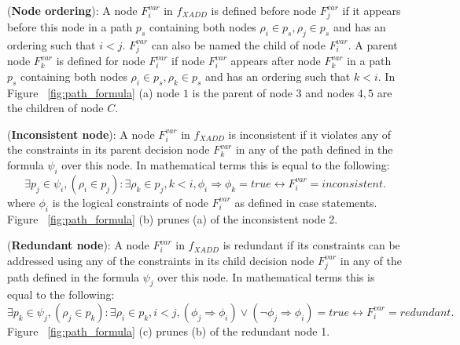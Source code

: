 \documentclass[twoside,11pt]{article}
\newenvironment{mydef}[1][Definition]{\begin{trivlist}
\item[\hskip \labelsep {\bfseries #1}]}{\end{trivlist}}
\begin{document}
\begin{mydef}(\textbf{Node ordering}):
A node $F_i^{var}$ in $f_{XADD}$ is defined before node $F_j^{var}$ if it appears before this node in a path $p_s$ containing both nodes $\rho_i \in p_s, \rho_j \in p_s$ and has an ordering such that $i<j$. $F_j^{var}$ can also be named the child of node $F_i^{var}$. A parent node $F_k^{var}$ is defined for node  $F_i^{var}$ if node  $F_i^{var}$ appears after node $F_k^{var}$ in a path $p_s$ containing both nodes $\rho_i \in p_s, \rho_k \in p_s$ and has an ordering such that $k<i$. In Figure ~\ref{fig:path_formula} (a) node $1$ is the parent of node $3$ and nodes $4,5$ are the children of node $C$.
\end{mydef}

\begin{mydef}(\textbf{Inconsistent node}):
A node $F_i^{var}$ in $f_{XADD}$ is inconsistent if it violates any of the constraints in its parent decision node $F_k^{var}$ in any of the path defined in the formula $\psi_{i}$ over this node. In mathematical terms this is equal to the following: 
 \begin{equation}
\exists p_j \in \psi_i , (\rho_i \in p_j): \exists \rho_k \in p_j, k<i , \phi_i \Rightarrow \phi_k = \textit{true} \longleftrightarrow F_i^{var} = inconsistent. \label{inconsist}
\end{equation} 
where  $\phi_i$ is the logical constraints of node $F_i^{var}$ as defined in case statements. Figure ~\ref{fig:path_formula} (b) prunes (a) of the inconsistent node 2.
\end{mydef}

\begin{mydef}(\textbf{Redundant node}):
A node $F_i^{var}$ in $f_{XADD}$ is redundant if its constraints can be addressed using any of the constraints in its child decision node $F_j^{var}$ in any of the path defined in the formula $\psi_{j}$ over this node. In mathematical terms this is equal to the following: 
 \begin{equation}
\exists p_k \in \psi_j , (\rho_j \in p_k): \exists \rho_i \in p_k, i<j , (\phi_j \Rightarrow \phi_i) \vee (\neg \phi_j \Rightarrow \phi_i) = \textit{true} \longleftrightarrow F_i^{var} = redundant.\label{redundant}
\end{equation} 
Figure ~\ref{fig:path_formula} (c) prunes (b) of the redundant node 1.
\end{mydef}

\end{document}
